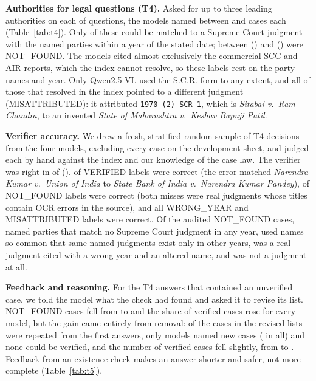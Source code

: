 \documentclass[conference]{IEEEtran}
\begin{document}
\textbf{Authorities for legal questions (T4).} Asked for up to three leading authorities on each of \NumTopics{} questions, the models named between \TFourCasesMin{} and \TFourCasesMax{} cases each (Table~\ref{tab:t4}). Only \TFourVerifiedRange{} of these could be matched to a Supreme Court judgment with the named parties within a year of the stated date; between \TFourNFMinPct{} (\TFourNFMinModel) and \TFourNFMaxPct{} (\TFourNFMaxModel) were NOT\_FOUND. The models cited almost exclusively the commercial SCC and AIR reports, which the index cannot resolve, so these labels rest on the party names and year. Only Qwen2.5-VL used the S.C.R. form to any extent, and all \TFourReporterResolvedMisQwenVL{} of those that resolved in the index pointed to a different judgment (MISATTRIBUTED): it attributed \texttt{1970 (2) SCR 1}, which is \emph{Sitabai v.\ Ram Chandra}, to an invented \emph{State of Maharashtra v.\ Keshav Bapuji Patil}.

\begin{table}[t]
\caption{T4: every case cited for \NumTopics{} legal questions, by verifier label. Ver.\ = VERIFIED (with Wilson 95\% interval), W.Yr.\ = WRONG\_YEAR, W.Cit.\ = WRONG\_CITATION, Misatt.\ = MISATTRIBUTED, N.F.\ = NOT\_FOUND.}
\label{tab:t4}
\centering
\footnotesize
\setlength{\tabcolsep}{3.5pt}

\end{table}

\textbf{Verifier accuracy.}
\label{sec:audit}
We drew a fresh, stratified random sample of \AuditN{} T4 decisions from the four models, excluding every case on the development sheet, and judged each by hand against the index and our knowledge of the case law. The verifier was right in \AuditCorrect{} of \AuditN{} (\AuditPct). \AuditVerCorrect{} of \AuditVerN{} VERIFIED labels were correct (the error matched \emph{Narendra Kumar v.\ Union of India} to \emph{State Bank of India v.\ Narendra Kumar Pandey}), \AuditNFCorrect{} of \AuditNFN{} NOT\_FOUND labels were correct (both misses were real judgments whose titles contain OCR errors in the source), and all \AuditWYN{} WRONG\_YEAR and \AuditMisN{} MISATTRIBUTED labels were correct. Of the \AuditNFN{} audited NOT\_FOUND cases, \AuditNFFab{} named parties that match no Supreme Court judgment in any year, \AuditNFGeneric{} used names so common that same-named judgments exist only in other years, \AuditNFMisdated{} was a real judgment cited with a wrong year and an altered name, and \AuditNFNotJudgment{} was not a judgment at all.

\textbf{Feedback and reasoning.} For the \TFiveQAll{} T4 answers that contained an unverified case, we told the model what the check had found and asked it to revise its list. NOT\_FOUND cases fell from \TFiveNFBeforeAll{} to \TFiveNFAfterAll{} and the share of verified cases rose for every model, but the gain came entirely from removal: \TFiveRepeatedAll{} of the \TFiveCasesAfterAll{} cases in the revised lists were repeated from the first answers, only \TFiveNewCaseModels{} models named new cases (\TFiveNewCasesAll{} in all) and none could be verified, and the number of verified cases fell slightly, from \TFiveVerBeforeAll{} to \TFiveVerAfterAll. Feedback from an existence check makes an answer shorter and safer, not more complete (Table~\ref{tab:t5}).
\end{document}
